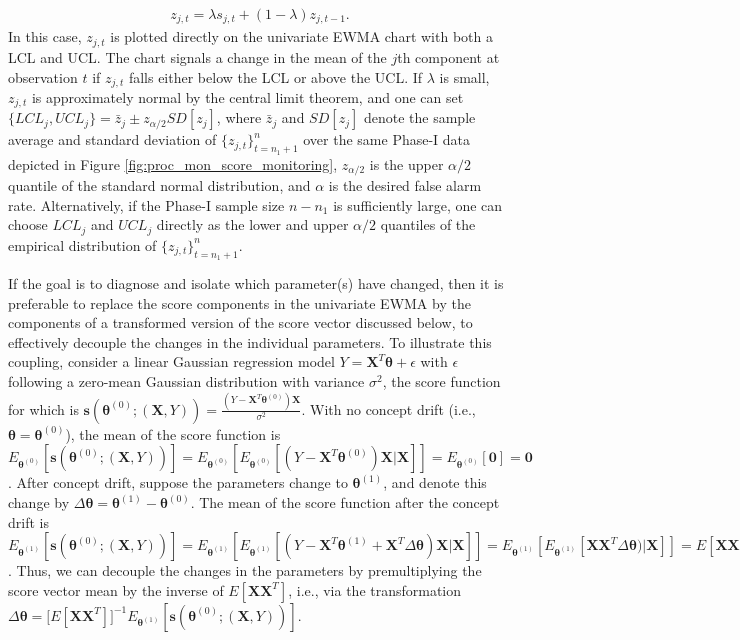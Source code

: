 \documentclass[twoside,11pt]{article}
\begin{document}
\begin{align}
z_{j,t} = \lambda s_{j,t} + (1 - \lambda) z_{j,t-1}.
\label{eqn:uniewma}
\end{align}
In this case, $z_{j,t}$ is plotted directly on the univariate EWMA chart with both a LCL and UCL. The chart signals a change in the mean of the $j$th component at observation $t$ if $z_{j,t}$ falls either below the LCL or above the UCL. If $\lambda$ is small, $z_{j,t}$ is approximately normal by the central limit theorem, and one can set  $\{LCL_j,UCL_j\} = \bar{z}_j \pm z_{\alpha/2}SD[z_j]$, where $\bar{z}_j$ and $SD[z_j]$ denote the sample average and standard deviation of $\{z_{j,t}\}_{t=n_1+1}^n$ over the same Phase-I data depicted in Figure \ref{fig:proc_mon_score_monitoring}, $z_{\alpha/2}$ is the upper $\alpha/2$ quantile of the standard normal distribution, and $\alpha$ is the desired false alarm rate. Alternatively, if the Phase-I sample size $n-n_1$ is sufficiently large, one can choose $LCL_j$ and $UCL_j$ directly as the lower and upper $\alpha/2$ quantiles of the empirical distribution of $\{z_{j,t}\}_{t=n_1+1}^n$. 

If the goal is to diagnose and isolate which parameter(s) have changed, then it is preferable to replace the score components in the univariate EWMA by the components of a transformed version of the score vector discussed below, to effectively decouple the changes in the individual parameters. To illustrate this coupling, consider a linear Gaussian regression model $Y = \bm{X}^T\bm{\theta} + \epsilon$ with $\epsilon$ following a zero-mean Gaussian distribution with variance $\sigma^2$, the score function for which is $\bm{s}(\bm { \theta}^{ (0)}; (\bm {X}, Y)) = \frac{(Y - \bm{X}^T\bm{\theta}^{ (0)})\bm{X}}{\sigma^2}$. With no concept drift (i.e., $\bm { \theta} = \bm { \theta}^{ (0)}$), the mean of the score function is $E_{\bm{ \theta}^{ (0)}}[\bm{s}(\bm { \theta}^{ (0)}; (\bm {X}, Y))] = E_{\bm{ \theta}^{ (0)}}[E_{\bm{ \theta}^{ (0)}}[(Y - \bm {X}^T\bm { \theta}^{ (0)} ) \bm {X}|\bm {X}]] =  E_{\bm{ \theta}^{ (0)}}[\bm{0}] = \bm{0}$. After concept drift, suppose the parameters change to $\bm { \theta} ^{ (1)}$, and denote this change by $ \Delta \bm { \theta} = \bm { \theta} ^{ (1)} - \bm { \theta}^ { (0)}$. The mean of the score function after the concept drift is $E_{\bm{ \theta}^{ (1)}}[\bm{s}(\bm { \theta}^{ (0)}; (\bm {X}, Y))] = E_{\bm{ \theta}^{ (1)}}[E_{\bm{ \theta}^{ (1)}}[(Y - \bm {X}^T\bm { \theta}^{ (1)} + \bm {X}^T\Delta \bm { \theta}) \bm {X} |\bm {X}]] = E_{\bm{ \theta}^{ (1)}}[E_{\bm{ \theta}^{ (1)}}[\bm {X}\bm {X}^T\Delta \bm { \theta}) |\bm {X}]] = E [\bm {X}\bm {X}^T] \Delta \bm { \theta}$. Thus, we can decouple the changes in the parameters by premultiplying the score vector mean by the inverse of $E [\bm {X}\bm {X}^T]$, i.e., via the transformation $ \Delta \bm { \theta} = \big[E [\bm {X}\bm {X}^T]\big]^{-1} E_{\bm{ \theta}^{ (1)}}[\bm{s}(\bm { \theta}^{ (0)}; (\bm {X}, Y))]$. 
\end{document}
